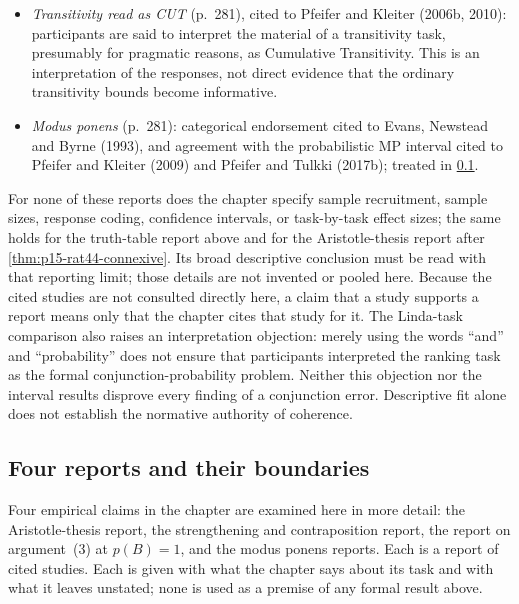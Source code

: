 \begin{itemize}
      participants recognized both as noninformative. The chapter
      attaches no citation to this sentence of its own; it follows the
      System P sentence and its four citations above. Its boundaries
      are in \cref{sec:p15-w02b-p15-038-evidence-boundaries}.
\item \emph{Transitivity read as CUT} (p.~281), cited to Pfeifer and
      Kleiter (2006b, 2010): participants are said to interpret the
      material of a transitivity task, presumably for pragmatic reasons,
      as Cumulative Transitivity. This is an interpretation of the
      responses, not direct evidence that the ordinary transitivity
      bounds become informative.
\item \emph{Modus ponens} (p.~281): categorical endorsement cited to
      Evans, Newstead and Byrne (1993), and agreement with the
      probabilistic MP interval cited to Pfeifer and Kleiter (2009) and
      Pfeifer and Tulkki (2017b); treated in
      \cref{sec:p15-w02b-p15-038-evidence-boundaries}.
\end{itemize}

For none of these reports does the chapter specify sample recruitment,
sample sizes, response coding, confidence intervals, or task-by-task
effect sizes; the same holds for the truth-table report above and for
the Aristotle-thesis report after \cref{thm:p15-rat44-connexive}. Its
broad descriptive conclusion must be read with that reporting limit;
those details are not invented or pooled here. Because the cited
studies are not consulted directly here, a claim that a study supports
a report means only that the chapter cites that study for it.
The Linda-task comparison also raises an interpretation
objection: merely using the words ``and'' and ``probability'' does not
ensure that participants interpreted the ranking task as the formal
conjunction-probability problem. Neither this objection nor the interval
results disprove every finding of a conjunction error. Descriptive fit
alone does not establish the normative authority of coherence.

\subsection{Four reports and their boundaries}
\label{sec:p15-w02b-p15-038-evidence-boundaries}

Four empirical claims in the chapter are examined here in more detail:
the Aristotle-thesis report, the strengthening and contraposition
report, the report on argument~(3) at \(p(B)=1\), and the modus ponens
reports. Each is a report of cited studies. Each is given with what the
chapter says about its task and with what it leaves unstated; none is
used as a premise of any formal result above.

